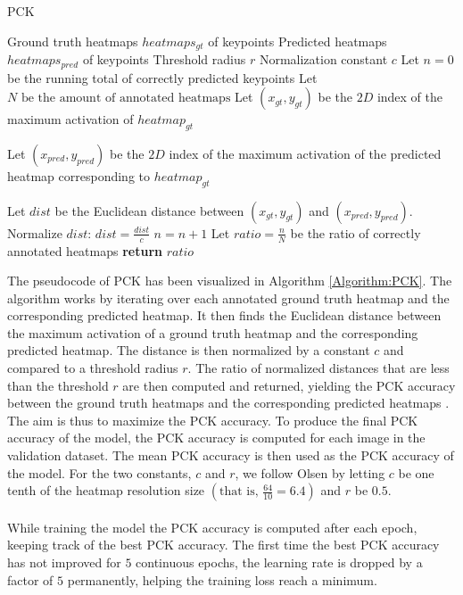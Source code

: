 \documentclass[./main.tex]{subfiles}
\begin{document}
\begin{algorithm}[t]
    \caption{PCK \cite{Camilla}\cite{SHG}}
    \label{Algorithm:PCK}
    \begin{algorithmic}[1]
        \Require Ground truth heatmaps $heatmaps_{gt}$ of keypoints
        \Require Predicted heatmaps $heatmaps_{pred}$ of keypoints
        \Require Threshold radius $r$
        \Require Normalization constant $c$
        \State Let $n = 0$ be the running total of correctly predicted keypoints
        \State Let $N \text{ be the amount of annotated heatmaps}$
            \State Let $(x_{gt}, y_{gt})$ be the $2D$ index of the maximum activation of $heatmap_{gt}$
            \State \begin{varwidth}[t]{\linewidth}
                Let $(x_{pred}, y_{pred})$ be the $2D$ index of the maximum activation of the predicted heatmap corresponding to $heatmap_{gt}$
            \end{varwidth}
            \State Let $dist$ be the Euclidean distance between $(x_{gt}, y_{gt})$ and $(x_{pred}, y_{pred})$.
            \State Normalize $dist$: $dist = \frac{dist}{c}$
                \State $n = n + 1$
            \EndIf
        \EndFor
        \State Let $ratio = \frac{n}{N}$ be the ratio of correctly annotated heatmaps
        \State \textbf{return} $ratio$
    \end{algorithmic}
\end{algorithm}
The pseudocode of PCK has been visualized in Algorithm \ref{Algorithm:PCK}. The algorithm works by iterating over each annotated ground truth heatmap and the corresponding predicted heatmap. It then finds the Euclidean distance between the maximum activation of a ground truth heatmap and the corresponding predicted heatmap. The distance is then normalized by a constant $c$ and compared to a threshold radius $r$. The ratio of normalized distances that are less than the threshold $r$ are then computed and returned, yielding the PCK accuracy between the ground truth heatmaps and the corresponding predicted heatmaps \cite{Camilla} \cite{SHG}. The aim is thus to maximize the PCK accuracy. To produce the final PCK accuracy of the model, the PCK accuracy is computed for each image in the validation dataset. The mean PCK accuracy is then used as the PCK accuracy of the model. For the two constants, $c$ and $r$, we follow Olsen \cite{Camilla} by letting $c$ be one tenth of the heatmap resolution size $\left(\text{that is, }\frac{64}{10} = 6.4 \right)$ and $r$ be $0.5$.
\\
\\
While training the model the PCK accuracy is computed after each epoch, keeping track of the best PCK accuracy. The first time the best PCK accuracy has not improved for $5$ continuous epochs, the learning rate is dropped by a factor of $5$ permanently, helping the training loss reach a minimum.
\end{document}
